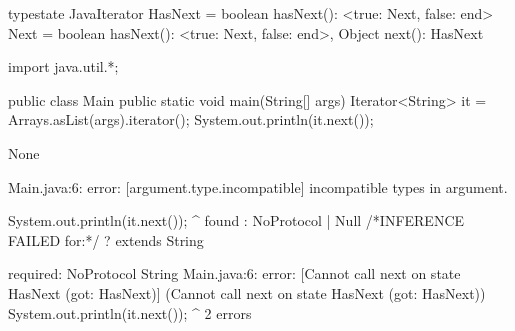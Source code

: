 \begin{code}
typestate JavaIterator {
    HasNext = {
        boolean hasNext(): <true: Next, false: end>
    }
    Next = {
        boolean hasNext(): <true: Next, false: end>,
        Object next(): HasNext
    }
}\end{code}

\begin{code}
import java.util.*;

public class Main {
	public static void main(String[] args) {
    Iterator<String> it = Arrays.asList(args).iterator();
    System.out.println(it.next());
	}
}\end{code}

\lstset{language=,caption=Mungo's output}
\begin{code}
None
\end{code}

\lstset{language=,caption=Our tool's output}
\begin{code}
Main.java:6: error: [argument.type.incompatible] incompatible types in argument.

    System.out.println(it.next());
                              ^
  found   : NoProtocol | Null /*INFERENCE FAILED for:*/ ? extends String

  required: NoProtocol String
Main.java:6: error: [Cannot call next on state HasNext (got: HasNext)] (Cannot call next on state HasNext (got: HasNext))
    System.out.println(it.next());
                              ^
2 errors
\end{code}

